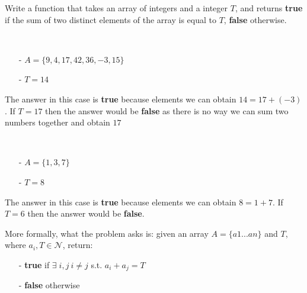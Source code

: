 \begin{exercise}
Write a function that takes an array of integers and a integer $T$, and returns \textbf{true} if the
sum of two distinct elements of the array is equal to $T$, \textbf{false} otherwise.


\begin{example}
\hfill \\
	\begin{itemize}
		\item[-] 	$A=\{9, 4, 17, 42, 36, -3 ,15\}$
		\item[-] 	$T = 14$
	\end{itemize}
The answer in this case is \textbf{true} because elements we can obtain $14=17+ (-3)$. If $T=17$
then the answer would be \textbf{false} as there is no way we can sum two numbers together and
obtain $17$
\end{example}

\begin{example}
\hfill \\
	\begin{itemize}
		\item[-] 	$A=\{1,3,7\}$
		\item[-] 	$T = 8$
	\end{itemize}
The answer in this case is \textbf{true} because elements we can obtain $8=1+7$. If $T=6$ then the
answer would be \textbf{false}.
\end{example}


More formally, what the problem asks is: given an array $A=\{a1...an\}$ and $T$, where $a_i, T \in
\mathcal{N}$, return:
	\begin{itemize}
		\item[-] \textbf{true }if $\exists \;i,j \: i \neq j$ s.t. $a_i+a_j = T$
		\item[-] \textbf{false} otherwise
	\end{itemize}
\end{exercise}	


